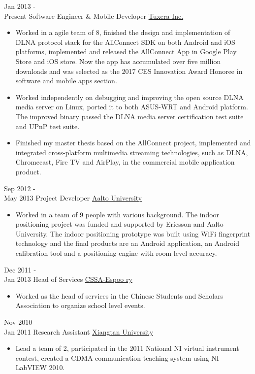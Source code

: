 \documentclass[letterpaper]{twentysecondcv} %
\begin{document}
\begin{twenty} %
	\twentyitem
    	{Jan 2013 - \\Present}
        {Software Engineer \& Mobile Developer}
        {\href{http://www.tuxera.com/}{Tuxera Inc.}}
        {}
        {
        {\begin{itemize}
        \item Worked in a agile team of 8, finished the design and implementation of DLNA protocol stack for the AllConnect SDK on both Android and iOS platforms, implemented and released the AllConnect App in Google Play Store and iOS store. Now the app has accumulated over five million downloads and was selected as the 2017 CES Innovation Award Honoree in software and mobile apps section.
        \item Worked independently on debugging and improving the open source DLNA media server on Linux, ported it to both ASUS-WRT and Android platform. The improved binary passed the DLNA media server certification test suite and UPnP test suite.
        \item Finished my master thesis based on the AllConnect project, implemented and integrated cross-platform multimedia streaming technologies, such as DLNA, Chromecast, Fire TV and AirPlay, in the commercial mobile application product.
    \end{itemize}}
        }
        
    \twentyitem
   		{Sep 2012 - \\ May 2013}
        {Project Developer}
        {\href{http://www.aalto.fi/en/}{Aalto University}}
        {}
        {
        {\begin{itemize}
        \item Worked in a team of 9 people with various background. The indoor positioning project was funded and supported by Ericsson and Aalto University. The indoor positioning prototype was built using WiFi fingerprint technology and the final products are an Android application, an Android calibration tool and a positioning engine with room-level accuracy.
    \end{itemize}}
        }
        
        \twentyitem
   		{Dec 2011 - \\ Jan 2013}
        {Head of Services}
        {\href{https://cssa.ayy.fi/}{CSSA-Espoo ry}}
        {}
        {
        \begin{itemize}
        \item Worked as the head of services in the Chinese Students and Scholars Association to organize school level events.
    \end{itemize}
    	}
     \twentyitem
   		{Nov 2010 - \\ Jan 2011}
        {Research Assistant}
        {\href{http://www.xtu.edu.cn/english/}{Xiangtan University}}
        {}
        {
        \begin{itemize}
        \item Lead a team of 2, participated in the 2011 National NI virtual instrument contest, created a CDMA communication teaching system using NI LabVIEW 2010.
    \end{itemize}
    	}
        
\end{twenty}
\end{document}
